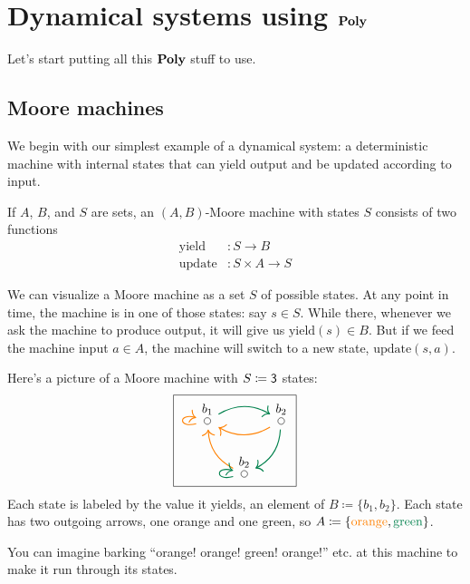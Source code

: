 \documentclass[Book-Poly]{subfiles}
\begin{document}
\section{Dynamical systems using $\mathbf{Poly}$}\label{sec.dynam_in_poly}

Let's start putting all this $\mathbf{Poly}$ stuff to use. 

\subsection{Moore machines}

We begin with our simplest example of a dynamical system: a deterministic machine with internal states that can yield output and be updated according to input.

\begin{definition}\label{def.moore_machine}
If $A$, $B$, and $S$ are sets, an $(A,B)$-Moore machine with states $S$ consists of two functions
\begin{align*}
	\text{yield}&\colon S\to B\\
	\text{update}&\colon S\times A\to S 
\end{align*}
\end{definition}

We can visualize a Moore machine as a set $S$ of possible states.
At any point in time, the machine is in one of those states: say $s \in S$.
While there, whenever we ask the machine to produce output, it will give us $\text{yield}(s) \in B$.
But if we feed the machine input $a \in A$, the machine will switch to a new state, $\text{update}(s, a)$.

\begin{example}\label{ex.Moore_three}
Here's a picture of a Moore machine with $S\coloneqq\textsf{3}$ states:
\[
\begin{tikzpicture}
	\node[draw] {
  \begin{tikzcd}[column sep=small]
  	\LMO{b_1}\ar[rr, dgreen, thick, bend left]\ar[loop left, thick, orange]&&
  	\LMO{b_2}\ar[ll, thick, orange, bend left]\ar[dl, bend left, thick, dgreen]\\&
  	\LMO{b_2} \ar[ul, thick, orange, bend left] \ar[loop left, thick, dgreen]
  \end{tikzcd}
  };
\end{tikzpicture}
\]
Each state is labeled by the value it yields, an element of $B\coloneqq\{b_1,b_2\}$. Each state has two outgoing arrows, one orange and one green, so $A\coloneqq\{{\color{orange}\text{orange}},{\color{dgreen}\text{green}}\}$.

You can imagine barking ``orange! orange! green! orange!'' etc. at this machine to make it run through its states.
\end{example}
\end{document}
